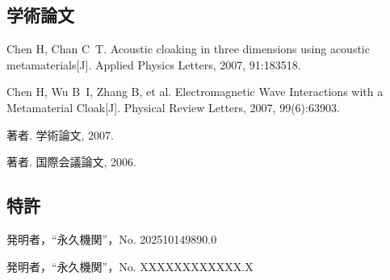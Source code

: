 \begin{achievements}

  \subsection*{学術論文}

  \begin{bibliolist}{00}
    \item Chen H, Chan C~T. Acoustic cloaking in three dimensions using acoustic metamaterials[J]. Applied Physics Letters, 2007, 91:183518.
    \item Chen H, Wu B~I, Zhang B, et al. Electromagnetic Wave Interactions with a Metamaterial Cloak[J]. Physical Review Letters, 2007, 99(6):63903.
  \end{bibliolist}

  \begin{bibliolist*}{00}
    \item 著者. 学術論文, 2007.
    \item 著者. 国際会議論文, 2006.
  \end{bibliolist*}

  \subsection*{特許}

  \begin{bibliolist}{00}
    \item 発明者，“永久機関”，No. 202510149890.0
  \end{bibliolist}

  \begin{bibliolist*}{00}
    \item 発明者，“永久機関”，No. XXXXXXXXXXXX.X
  \end{bibliolist*}

\end{achievements}
